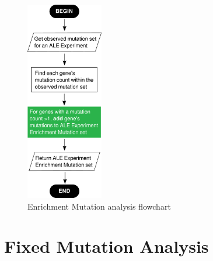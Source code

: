 \documentclass[12pt,final,masters,chapterheads]{ucsd}  %
\begin{document}
\begin{figure}[H]
  \caption{Enrichment Mutation analysis flowchart}
  \centering
  \includegraphics[width=0.3\textwidth]{enrichment_mutation_flowchart.png}
\end{figure}

\section{Fixed Mutation Analysis}
\end{document}
